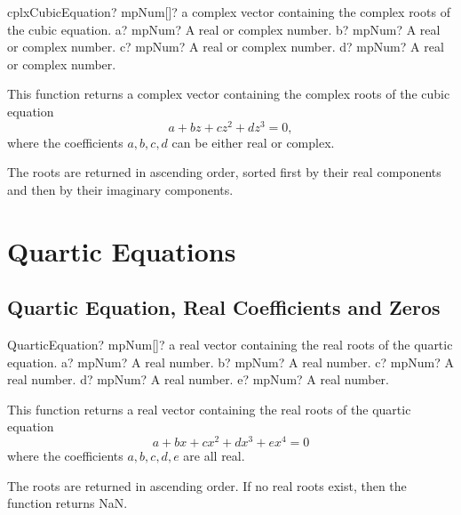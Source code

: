 \begin{mpFunctionsExtract}
	\mpFunctionFour
	{cplxCubicEquation? mpNum[]? a complex vector containing the complex roots of the cubic equation.}
	{a? mpNum? A real or complex number.}
	{b? mpNum? A real or complex number.}
	{c? mpNum? A real or complex number.}
	{d? mpNum? A real or complex number.}
\end{mpFunctionsExtract}


\vspace{0.3cm}
This function returns  a complex vector containing the complex roots of the cubic equation
\begin{equation}
a  + b z + c z^2 + d z^3  = 0,
\end{equation}
where the coefficients $a, b, c, d$ can be either real or complex. 

The roots are returned in ascending order, sorted first by their real components and then by their imaginary components.






\section{Quartic Equations}
\label{QuarticEquationsPolynomials}

\subsection{Quartic Equation, Real Coefficients and Zeros}


\begin{mpFunctionsExtract}
	\mpFunctionFive
	{QuarticEquation? mpNum[]? a real vector containing the real roots of the quartic equation.}
	{a? mpNum? A real number.}
	{b? mpNum? A real number.}
	{c? mpNum? A real number.}
	{d? mpNum? A real number.}
	{e? mpNum? A real number.}
\end{mpFunctionsExtract}


\vspace{0.3cm}
This function returns a real vector containing the real roots of the quartic equation
\begin{equation}
a  + b x + c x^2 + d x^3  + e x^4  = 0
\end{equation}
where the coefficients $a, b, c, d, e$ are all real. 

The roots are returned in ascending order. If no real roots exist, then the function returns NaN.




